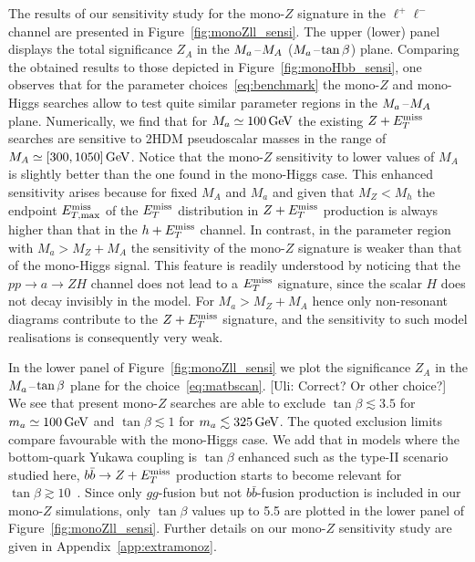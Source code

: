 The results of our sensitivity study for the mono-$Z$ signature in the $\ell^+ \ell^-$ channel are presented in Figure~\ref{fig:monoZll_sensi}. The upper (lower) panel displays the total significance $Z_A$  in the $M_{a}\hspace{0.25mm}$--$\hspace{0.25mm}M_{A}$ ($M_{a}\hspace{0.25mm}$--$\hspace{0.25mm}\tan \beta$) plane. Comparing the obtained results to those depicted in Figure~\ref{fig:monoHbb_sensi}, one observes that for the parameter choices~\eqref{eq:benchmark} the mono-$Z$ and mono-Higgs searches allow to test quite similar parameter regions in the $M_{a}\hspace{0.25mm}$--$\hspace{0.25mm}M_{A}$ plane. Numerically, we find  that for $M_{a} \simeq 100 \, {\rm GeV}$  the existing $Z + E_T^\mathrm{miss}$ searches are sensitive to 2HDM pseudoscalar masses  in the range of $M_{A} \simeq [300, 1050] \, {\rm GeV}$. Notice that the mono-$Z$ sensitivity to lower values of $M_A$ is slightly better than the one found in the mono-Higgs case. This enhanced sensitivity arises because for fixed $M_A$ and $M_a$ and given that $M_Z < M_h$ the endpoint $E_{T, \rm max}^{\rm miss}$ of the $E_T^\mathrm{miss}$ distribution in $Z+ E_T^\mathrm{miss}$ production is always higher  than that in  the $h+ E_T^\mathrm{miss}$ channel. In contrast, in the parameter region with $M_a > M_Z + M_A$ the sensitivity of the mono-$Z$ signature is weaker than that of the mono-Higgs  signal. This feature is readily understood by noticing that the $pp \to a \to Z H$ channel does not lead to a $E_T^\mathrm{miss}$ signature, since the scalar $H$ does not decay invisibly in the \hdma model. For $M_a > M_Z + M_A$ hence only non-resonant diagrams contribute to the $Z+E_T^\mathrm{miss}$ signature, and the sensitivity to such model realisations is consequently very weak. 

{\color{red} In the lower panel of Figure~\ref{fig:monoZll_sensi} we plot the significance $Z_A$ in the $M_{a}\hspace{0.25mm}$--$\hspace{0.25mm}\tan \beta$ plane for the choice~\eqref{eq:matbscan}. } {\color{red} [Uli: Correct? Or other choice?]} We see that present mono-$Z$ searches are able to exclude $\tan \beta \lesssim 3.5$ for $m_a \simeq 100 \, {\rm GeV}$ and $\tan \beta \lesssim 1$ for $m_a \lesssim 325 \, {\rm GeV}$. The quoted exclusion limits compare favourable with the mono-Higgs case. We add that in models where the bottom-quark Yukawa coupling is $\tan \beta$ enhanced such as the type-II scenario studied here, $b \bar b \to Z + E_T^\mathrm{miss}$ production starts to become relevant for  $\tan \beta \gtrsim 10$~\cite{Bauer:2017ota}. Since only $gg$-fusion but not $b \bar b$-fusion production is included in our mono-$Z$ simulations, only $\tan \beta$ values up to 5.5 are plotted in the lower panel of Figure~\ref{fig:monoZll_sensi}. Further details on our mono-$Z$ sensitivity study are given in Appendix~\ref{app:extramonoz}.

